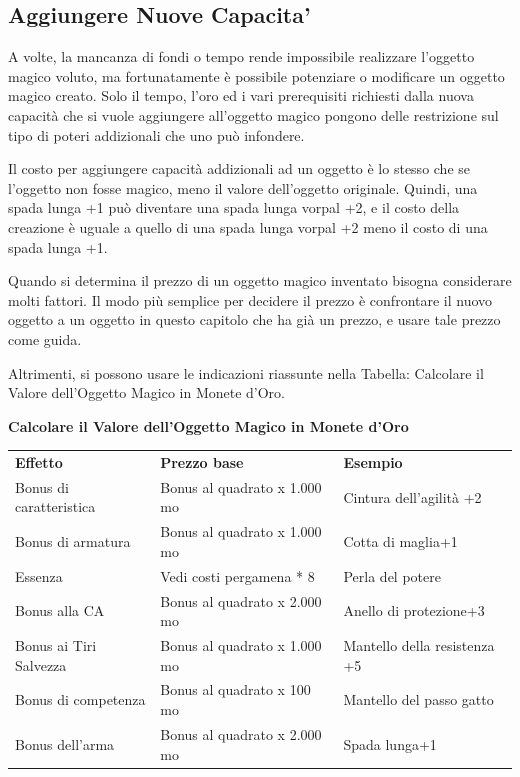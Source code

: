 \documentclass[a4paper,11pt,twoside,openany]{book}
\begin{document}
\subsection{Aggiungere Nuove Capacita'}

A volte, la mancanza di fondi o tempo rende impossibile realizzare l'oggetto magico voluto, ma fortunatamente è possibile potenziare o modificare un oggetto magico creato. Solo il tempo, l'oro ed i vari prerequisiti richiesti dalla nuova capacità che si vuole aggiungere all'oggetto magico pongono delle restrizione sul tipo di poteri addizionali che uno può infondere.

Il costo per aggiungere capacità addizionali ad un oggetto è lo stesso che se l'oggetto non fosse magico, meno il valore dell'oggetto originale. Quindi, una spada lunga +1 può diventare una spada lunga vorpal +2, e il costo della creazione è uguale a quello di una spada lunga vorpal +2 meno il costo di una spada lunga +1.

Quando si determina il prezzo di un oggetto magico inventato bisogna considerare molti fattori. Il modo più semplice per decidere il prezzo è confrontare il nuovo oggetto a un oggetto in questo capitolo che ha già un prezzo, e usare tale prezzo come guida.

Altrimenti, si possono usare le indicazioni riassunte nella Tabella: Calcolare il Valore dell'Oggetto Magico in Monete d'Oro.

\bigskip

\textbf{Calcolare il Valore dell'Oggetto Magico in Monete d'Oro}

\begin{tabular}{lll}
	\toprule
	\textbf{Effetto}        & \textbf{Prezzo base}         & \textbf{Esempio}\tabularnewline
	Bonus di caratteristica & Bonus al quadrato x 1.000 mo & Cintura dell'agilità +2\tabularnewline
	Bonus di armatura       & Bonus al quadrato x 1.000 mo & Cotta di maglia+1\tabularnewline
	Essenza                 & Vedi costi pergamena {*} 8   & Perla del potere\tabularnewline
	Bonus alla CA           & Bonus al quadrato x 2.000 mo & Anello di protezione+3\tabularnewline
	Bonus ai Tiri Salvezza  & Bonus al quadrato x 1.000 mo & Mantello della resistenza +5\tabularnewline
	Bonus di competenza     & Bonus al quadrato x 100 mo   & Mantello del passo gatto\tabularnewline
	Bonus dell'arma         & Bonus al quadrato x 2.000 mo & Spada lunga+1\tabularnewline
\end{tabular}
\end{document}
